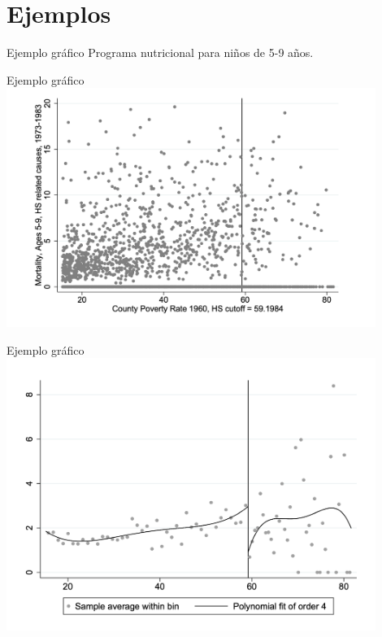 \documentclass[
  ignorenonframetext,
]{beamer}
\begin{document}
\hypertarget{ejemplos}{%
\section{Ejemplos}\label{ejemplos}}

\begin{frame}{Ejemplo gráfico}
\protect\hypertarget{ejemplo-gruxe1fico}{}
Programa nutricional para niños de 5-9 años.
\end{frame}

\begin{frame}{Ejemplo gráfico}
\protect\hypertarget{ejemplo-gruxe1fico-1}{}
\includegraphics[width=0.9\textwidth,height=\textheight]{ej1}
\end{frame}

\begin{frame}{Ejemplo gráfico}
\protect\hypertarget{ejemplo-gruxe1fico-2}{}
\includegraphics[width=0.9\textwidth,height=\textheight]{ej2}
\end{frame}
\end{document}
